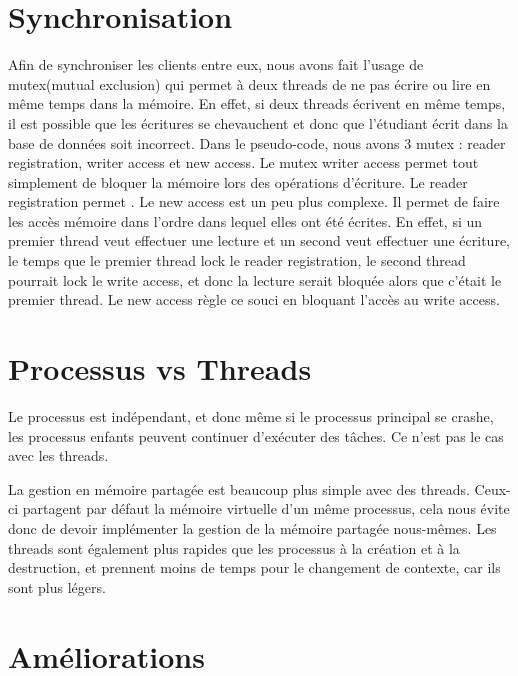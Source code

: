 \documentclass[utf8]{article}
\begin{document}
\section{Synchronisation}
\par
\indent

Afin de synchroniser les clients entre eux, nous avons fait l'usage de mutex(mutual exclusion) qui permet
à deux threads de ne pas écrire ou lire en même temps dans la mémoire.
En effet, si deux threads écrivent en même temps, il est possible que les écritures se chevauchent et donc que l'étudiant écrit dans la base de données soit incorrect.
\newline
Dans le pseudo-code, nous avons 3 mutex : reader registration, writer access et new access.
Le mutex writer access permet tout simplement de bloquer la mémoire lors des opérations d'écriture. Le reader registration permet .
Le new access est un peu plus complexe. Il permet de faire les accès mémoire dans l'ordre dans lequel elles ont été écrites.
En effet, si un premier thread veut effectuer une lecture et un second veut effectuer une écriture, le temps que le premier thread lock le reader registration, le second 
thread pourrait lock le write access, et donc la lecture serait bloquée alors que c'était le premier thread.
Le new access règle ce souci en bloquant l'accès au write access.
\par
\section{Processus vs Threads}
\par
\indent

Le processus est indépendant, et donc même si le processus principal se crashe, les processus enfants peuvent continuer d'exécuter des tâches. Ce n'est pas le cas avec les threads.

La gestion en mémoire partagée est beaucoup plus simple avec des threads. Ceux-ci partagent par défaut la mémoire virtuelle d'un même processus, cela nous évite donc de devoir implémenter la gestion de la mémoire partagée nous-mêmes.
Les threads sont également plus rapides que les processus à la création et à la destruction, et prennent moins de temps pour le changement de contexte, car ils sont plus légers.\newline



\par
\section{Améliorations}
\par
\indent
\end{document}
